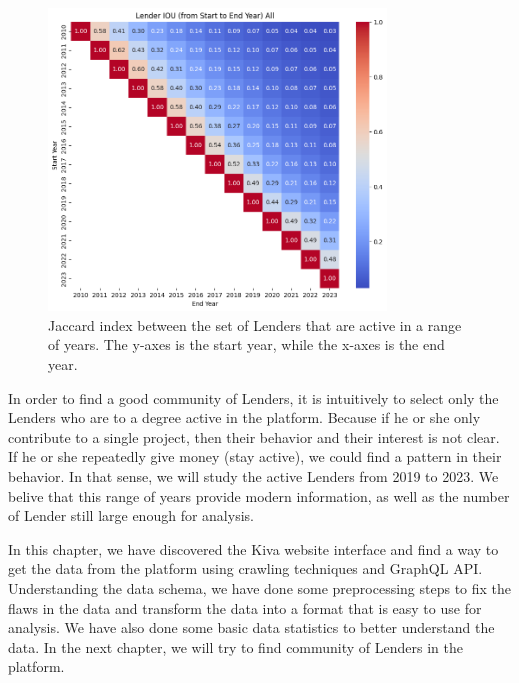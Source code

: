 \begin{figure}[H]
	\centering
	\includegraphics[width=0.8\textwidth]{images/active-fromto.png}
	\caption[Jaccard index between the set of Lenders that are active in a range of years.]{
		Jaccard index between the set of Lenders that are active in a range of years.
		The y-axes is the start year, while the x-axes is the end year.
	}
	\label{fig:active-fromto}
\end{figure}

In order to find a good community of Lenders,
it is intuitively to select only the Lenders who are to a degree active in the platform.
Because if he or she only contribute to a single project,
then their behavior and their interest is not clear.
If he or she repeatedly give money (stay active),
we could find a pattern in their behavior.
In that sense, we will study the active Lenders from 2019 to 2023.
We belive that this range of years provide modern information,
as well as the number of Lender still large enough for analysis.

In this chapter, we have discovered the Kiva website interface
and find a way to get the data from the platform using crawling techniques and GraphQL API.
Understanding the data schema, we have done some preprocessing steps to
fix the flaws in the data and transform the data into a format that is easy to use for analysis.
We have also done some basic data statistics to better understand the data.
In the next chapter, we will try to find community of Lenders in the platform.
